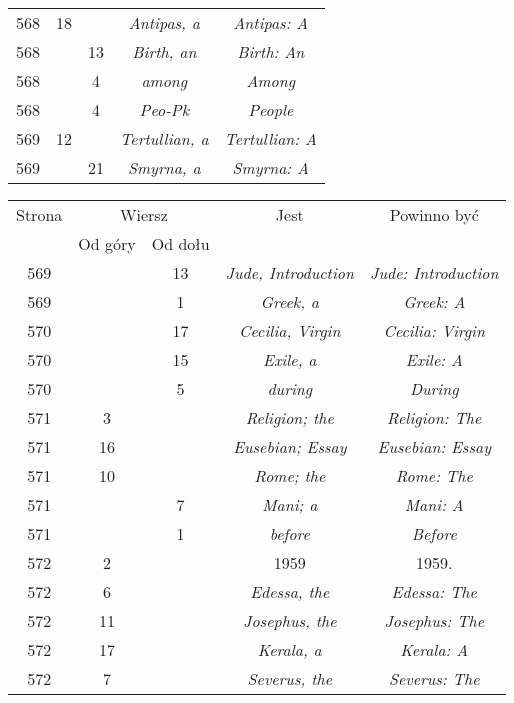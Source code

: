 \documentclass[a4paper,11pt]{article}
\begin{document}
\begin{center}
\begin{tabular}{|c|c|c|c|c|}
    568 & 18 & & \textit{Antipas, a} & \textit{Antipas: A} \\
    568 & & 13 & \textit{Birth, an} & \textit{Birth: An} \\
    568 & &  4 & \textit{among} & \textit{Among} \\
    568 & &  4 & \textit{Peo-Pk} & \textit{People} \\
    569 & 12 & & \textit{Tertullian, a} & \textit{Tertullian: A} \\
    569 & & 21 & \textit{Smyrna, a} & \textit{Smyrna: A} \\
    \hline
  \end{tabular}





  \newpage

  \begin{tabular}{|c|c|c|c|c|}
    \hline
    Strona & \multicolumn{2}{c|}{Wiersz} & Jest
    & Powinno być \\ \cline{2-3}
    & Od góry & Od dołu & & \\
    \hline
    569 & & 13 & \textit{Jude, Introduction}
    & \textit{Jude: Introduction} \\
    569 & &  1 & \textit{Greek, a} & \textit{Greek: A} \\
    570 & & 17 & \textit{Cecilia, Virgin} & \textit{Cecilia: Virgin} \\
    570 & & 15 & \textit{Exile, a} & \textit{Exile: A} \\
    570 & &  5 & \textit{during} & \textit{During} \\
    571 &  3 & & \textit{Religion; the} & \textit{Religion: The} \\
    571 & 16 & & \textit{Eusebian; Essay} & \textit{Eusebian: Essay} \\
    571 & 10 & & \textit{Rome; the} & \textit{Rome: The} \\
    571 & &  7 & \textit{Mani; a} & \textit{Mani: A} \\
    571 & &  1 & \textit{before} & \textit{Before} \\
    572 &  2 & & 1959 & 1959. \\
    572 &  6 & & \textit{Edessa, the} & \textit{Edessa: The} \\
    572 & 11 & & \textit{Josephus, the} & \textit{Josephus: The} \\
    572 & 17 & & \textit{Kerala, a} & \textit{Kerala: A} \\
    572 &  7 & & \textit{Severus, the} & \textit{Severus: The} \\

\end{tabular}
\end{center}
\end{document}
